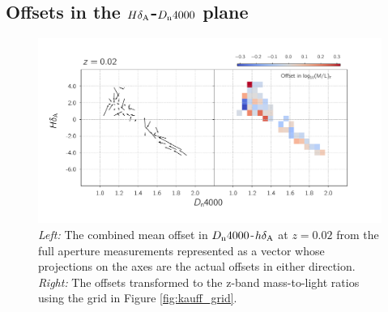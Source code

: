 \subsection{Offsets in the $H\delta_{\rm A}$-$D_{\rm n}4000$ plane}

\begin{figure}
\includegraphics[width=\textwidth]{figures/mlz_offset_a.pdf}
\caption[  \emph{Left:} The combined mean offset in $D_{\rm n}4000$-$h\delta_{\rm A}$ at $z=0.02$ from the full aperture measurements represented as a vector whose projections on the axes are the actual offsets in either direction. \emph{Right:} The offsets transformed to the z-band mass-to-light ratios using the grid in Figure \ref{fig:kauff_grid}. ]{ \emph{Left:} The combined mean offset in $D_{\rm n}4000$-$h\delta_{\rm A}$ at $z=0.02$ from the full aperture measurements represented as a vector whose projections on the axes are the actual offsets in either direction. \emph{Right:} The offsets transformed to the z-band mass-to-light ratios using the grid in Figure \ref{fig:kauff_grid}.
\label{fig:offset_quiver1}}
\end{figure}


